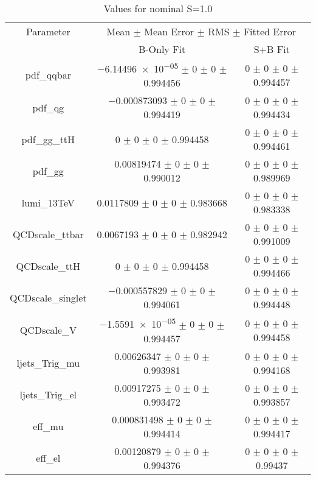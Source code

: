 \begin{table}
\centering
\caption{Values for nominal S=1.0}
\begin{tabular}{ccc}
\toprule
Parameter 	& \multicolumn{2}{c}{Mean $\pm$ Mean Error $\pm$ RMS $\pm$ Fitted Error}\\
 	& B-Only Fit & S+B Fit\\
\midrule
pdf\_qqbar 	& \num{-6.14496e-05} $\pm$ \num{0} $\pm$ \num{0} $\pm$ \num{0.994456} 	& \num{0} $\pm$ \num{0} $\pm$ \num{0} $\pm$ \num{0.994457}\\
pdf\_qg 	& \num{-0.000873093} $\pm$ \num{0} $\pm$ \num{0} $\pm$ \num{0.994419} 	& \num{0} $\pm$ \num{0} $\pm$ \num{0} $\pm$ \num{0.994434}\\
pdf\_gg\_ttH 	& \num{0} $\pm$ \num{0} $\pm$ \num{0} $\pm$ \num{0.994458} 	& \num{0} $\pm$ \num{0} $\pm$ \num{0} $\pm$ \num{0.994461}\\
pdf\_gg 	& \num{0.00819474} $\pm$ \num{0} $\pm$ \num{0} $\pm$ \num{0.990012} 	& \num{0} $\pm$ \num{0} $\pm$ \num{0} $\pm$ \num{0.989969}\\
lumi\_13TeV 	& \num{0.0117809} $\pm$ \num{0} $\pm$ \num{0} $\pm$ \num{0.983668} 	& \num{0} $\pm$ \num{0} $\pm$ \num{0} $\pm$ \num{0.983338}\\
QCDscale\_ttbar 	& \num{0.0067193} $\pm$ \num{0} $\pm$ \num{0} $\pm$ \num{0.982942} 	& \num{0} $\pm$ \num{0} $\pm$ \num{0} $\pm$ \num{0.991009}\\
QCDscale\_ttH 	& \num{0} $\pm$ \num{0} $\pm$ \num{0} $\pm$ \num{0.994458} 	& \num{0} $\pm$ \num{0} $\pm$ \num{0} $\pm$ \num{0.994466}\\
QCDscale\_singlet 	& \num{-0.000557829} $\pm$ \num{0} $\pm$ \num{0} $\pm$ \num{0.994061} 	& \num{0} $\pm$ \num{0} $\pm$ \num{0} $\pm$ \num{0.994448}\\
QCDscale\_V 	& \num{-1.5591e-05} $\pm$ \num{0} $\pm$ \num{0} $\pm$ \num{0.994457} 	& \num{0} $\pm$ \num{0} $\pm$ \num{0} $\pm$ \num{0.994458}\\
ljets\_Trig\_mu 	& \num{0.00626347} $\pm$ \num{0} $\pm$ \num{0} $\pm$ \num{0.993981} 	& \num{0} $\pm$ \num{0} $\pm$ \num{0} $\pm$ \num{0.994168}\\
ljets\_Trig\_el 	& \num{0.00917275} $\pm$ \num{0} $\pm$ \num{0} $\pm$ \num{0.993472} 	& \num{0} $\pm$ \num{0} $\pm$ \num{0} $\pm$ \num{0.993857}\\
eff\_mu 	& \num{0.000831498} $\pm$ \num{0} $\pm$ \num{0} $\pm$ \num{0.994414} 	& \num{0} $\pm$ \num{0} $\pm$ \num{0} $\pm$ \num{0.994417}\\
eff\_el 	& \num{0.00120879} $\pm$ \num{0} $\pm$ \num{0} $\pm$ \num{0.994376} 	& \num{0} $\pm$ \num{0} $\pm$ \num{0} $\pm$ \num{0.99437}\\

\end{tabular}
\end{table}
